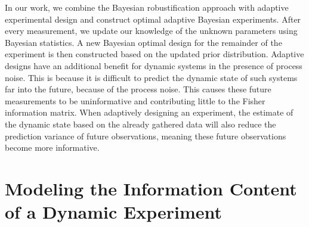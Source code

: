 In our work, we combine the Bayesian robustification approach with adaptive experimental design and construct optimal adaptive Bayesian experiments. After every measurement, we update our knowledge of the unknown parameters using Bayesian statistics. A new Bayesian optimal design for the remainder of the experiment is then constructed based on the updated prior distribution. Adaptive designs have an additional benefit for dynamic systems in the presence of process noise. This is because it is difficult to predict the dynamic state of such systems far into the future, because of the process noise. This causes these future measurements to be uninformative and contributing little to the Fisher information matrix. When adaptively designing an experiment, the estimate of the dynamic state based on the already gathered data will also reduce the prediction variance of future observations, meaning these future observations become more informative.
\section{Modeling the Information Content of a Dynamic Experiment}
